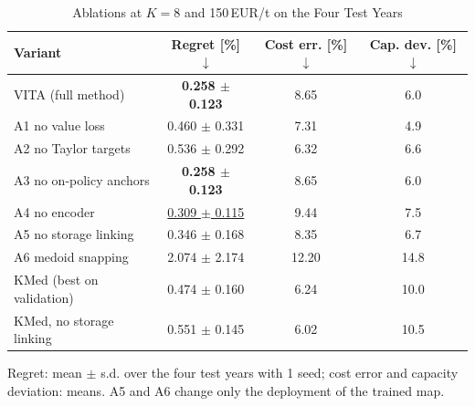 \begin{table}[!t]
\centering
\caption{Ablations at $K=8$ and 150\,EUR/t on the Four Test Years\label{tab:ablation}}
\footnotesize
\setlength{\tabcolsep}{2pt}
\begin{tabular}{@{}lccc@{}}
\toprule
Variant & Regret [\%] $\downarrow$ & Cost err. [\%] $\downarrow$ & Cap. dev. [\%] $\downarrow$ \\
\midrule
VITA (full method) & \textbf{0.258 $\pm$ 0.123} & 8.65 & 6.0 \\
A1 no value loss & 0.460 $\pm$ 0.331 & 7.31 & 4.9 \\
A2 no Taylor targets & 0.536 $\pm$ 0.292 & 6.32 & 6.6 \\
A3 no on-policy anchors & \textbf{0.258 $\pm$ 0.123} & 8.65 & 6.0 \\
A4 no encoder & \underline{0.309 $\pm$ 0.115} & 9.44 & 7.5 \\
A5 no storage linking & 0.346 $\pm$ 0.168 & 8.35 & 6.7 \\
A6 medoid snapping & 2.074 $\pm$ 2.174 & 12.20 & 14.8 \\
\midrule
KMed (best on validation) & 0.474 $\pm$ 0.160 & 6.24 & 10.0 \\
KMed, no storage linking & 0.551 $\pm$ 0.145 & 6.02 & 10.5 \\
\bottomrule
\end{tabular}
\par\vspace{1mm}\parbox{0.98\columnwidth}{\footnotesize Regret: mean $\pm$ s.d. over the four test years with 1 seed; cost error and capacity deviation: means. A5 and A6 change only the deployment of the trained map.}
\end{table}
